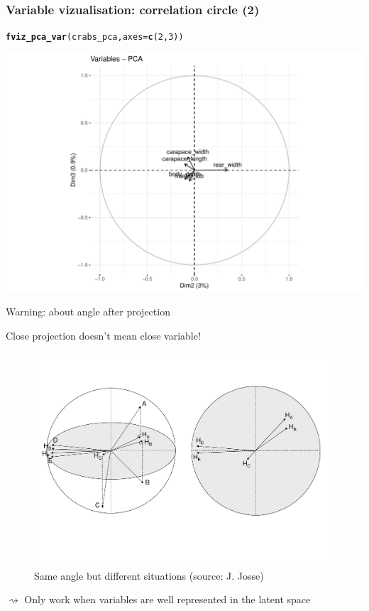 \documentclass{beamer}\usepackage[]{graphicx}\usepackage[]{color}
\makeatletter
\newcommand{\hlnum}[1]{\textcolor[rgb]{0.686,0.059,0.569}{#1}}%
\newcommand{\hlstd}[1]{\textcolor[rgb]{0.345,0.345,0.345}{#1}}%
\newcommand{\hlkwc}[1]{\textcolor[rgb]{0.333,0.667,0.333}{#1}}%
\newcommand{\hlkwd}[1]{\textcolor[rgb]{0.737,0.353,0.396}{\textbf{#1}}}%
\newenvironment{kframe}{%
 \def\at@end@of@kframe{}%
 \ifinner\ifhmode%
  \def\at@end@of@kframe{\end{minipage}}%
  \begin{minipage}{\columnwidth}%
 \fi\fi%
 \def\FrameCommand##1{\hskip\@totalleftmargin \hskip-\fboxsep
 \colorbox{shadecolor}{##1}\hskip-\fboxsep
     \hskip-\linewidth \hskip-\@totalleftmargin \hskip\columnwidth}%
 \MakeFramed {\advance\hsize-\width
   \@totalleftmargin\z@ \linewidth\hsize
   \@setminipage}}%
 {\par\unskip\endMakeFramed%
 \at@end@of@kframe}
\newenvironment{knitrout}{}{} %
\makeatother
\begin{document}
\begin{frame}[fragile]
  \frametitle{Variable vizualisation: correlation circle (2)}

\begin{knitrout}\scriptsize
{}\color{fgcolor}\begin{kframe}
\begin{alltt}
\hlkwd{fviz_pca_var}\hlstd{(crabs_pca,} \hlkwc{axes} \hlstd{=} \hlkwd{c}\hlstd{(}\hlnum{2}\hlstd{,}\hlnum{3}\hlstd{))}
\end{alltt}
\end{kframe}
\includegraphics[width=.8\textwidth]{figures/pca_crabs_varmap2-1} 

\end{knitrout}

\end{frame}

\begin{frame}{Warning: about angle after projection}

  \alert{Close projection doesn't mean close variable!}

  \begin{figure}
    \includegraphics[width = .85\textwidth]{proj_var_acp}
    \caption{Same angle but different situations {\tiny (source: J. Josse)}}

  \end{figure}

 $\rightsquigarrow$ Only work when variables are well represented in the latent space
\end{frame}
\end{document}
